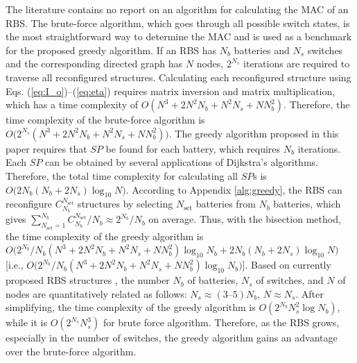 \documentclass{article}
\begin{document}
The literature contains no report on an algorithm for calculating the MAC of an RBS.
The brute-force algorithm, which goes through all possible switch states, is the most straightforward way to determine the MAC and is used as a benchmark for the proposed greedy algorithm.
If an RBS has $N_b$ batteries and $N_s$ switches and the corresponding directed graph has $N$ nodes,  $2^{N_s}$ iterations are required to traverse all reconfigured structures.
Calculating each reconfigured structure using Eqs. (\ref{eq:I_o})--(\ref{eq:eta}) requires matrix inversion and matrix multiplication, which has a time complexity of $O(N^3+2N^2N_b+N^2N_s+NN^2_b)$.
Therefore, the time complexity of the brute-force algorithm is $O\bm(2^{N_s}(N^3+2N^2N_b+N^2N_s+NN^2_b)\bm)$.
The greedy algorithm proposed in this paper requires  that $SP$ be found for each battery, which requires $N_b$ iterations.
Each $SP$ can be obtained by several applications of Dijkstra's algorithms.
Therefore, the total time complexity for calculating all $SP$s is $O\bm(2N_b(N_b+2N_s)\log_{10} N\bm)$.
According to  Appendix \ref{alg:greedy}, the RBS can reconfigure $C^{N_{\text{set}}}_{N_b}$ structures by selecting $N_{\text{set}}$ batteries from $N_b$ batteries, which gives $\sum^{N_b}_{N_{\text{set}}=1}C^{N_{\text{set}}}_{N_b}/N_b \approx 2^{N_b}/N_b$ on average.
Thus, with the bisection method, the time complexity of the greedy algorithm is $O\bm(2^{N_b}/N_b(N^3+2N^2N_b+N^2N_s+NN^2_b)\log_{10} N_b+2N_b(N_b+2N_s)\log_{10} N\bm)$ [i.e., $O\bm(2^{N_b}/N_b(N^3+2N^2N_b+N^2N_s+NN^2_b)\log_{10} N_b\bm)$].
Based on currently proposed RBS structures \cite{ciNovelDesignAdaptive2007,alahmadBatterySwitchArray2008,kimDependableEfficientScalable2010b,kimBalancedReconfigurationStorage2011a,taesickimSeriesconnectedSelfreconfigurableMulticell2012a,6843711}, the number $N_b$ of batteries, $N_s$ of switches, and $N$ of nodes are quantitatively related as follows: $N_s \approx (3\text{--} 5)N_b$, $N \approx N_s$. 
After simplifying, the time complexity of the greedy algorithm is $O(2^{N_b}N_s^2\log N_b)$, while it is $O(2^{N_s}N_s^3)$ for brute force algorithm.
Therefore, as the RBS grows, especially in the number of switches, the greedy algorithm gains an advantage over the brute-force algorithm.
\end{document}
